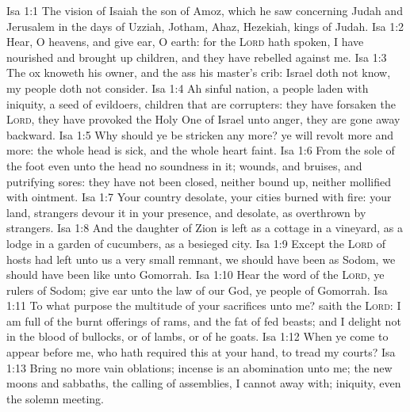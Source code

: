 \vs Isa 1:1 The vision of Isaiah the son of Amoz, which he saw concerning Judah and Jerusalem in the days of Uzziah, Jotham, Ahaz,  Hezekiah, kings of Judah.
\vs Isa 1:2 Hear, O heavens, and give ear, O earth: for the \textsc{Lord} hath spoken, I have nourished and brought up children, and they have rebelled against me.
\vs Isa 1:3 The ox knoweth his owner, and the ass his master's crib:  Israel doth not know, my people doth not consider.
\vs Isa 1:4 Ah sinful nation, a people laden with iniquity, a seed of evildoers, children that are corrupters: they have forsaken the \textsc{Lord}, they have provoked the Holy One of Israel unto anger, they are gone away backward.
\vs Isa 1:5 Why should ye be stricken any more? ye will revolt more and more: the whole head is sick, and the whole heart faint.
\vs Isa 1:6 From the sole of the foot even unto the head  no soundness in it;  wounds, and bruises, and putrifying sores: they have not been closed, neither bound up, neither mollified with ointment.
\vs Isa 1:7 Your country  desolate, your cities  burned with fire: your land, strangers devour it in your presence, and  desolate, as overthrown by strangers.
\vs Isa 1:8 And the daughter of Zion is left as a cottage in a vineyard, as a lodge in a garden of cucumbers, as a besieged city.
\vs Isa 1:9 Except the \textsc{Lord} of hosts had left unto us a very small remnant, we should have been as Sodom,  we should have been like unto Gomorrah.
\vs Isa 1:10 Hear the word of the \textsc{Lord}, ye rulers of Sodom; give ear unto the law of our God, ye people of Gomorrah.
\vs Isa 1:11 To what purpose  the multitude of your sacrifices unto me? saith the \textsc{Lord}: I am full of the burnt offerings of rams, and the fat of fed beasts; and I delight not in the blood of bullocks, or of lambs, or of he goats.
\vs Isa 1:12 When ye come to appear before me, who hath required this at your hand, to tread my courts?
\vs Isa 1:13 Bring no more vain oblations; incense is an abomination unto me; the new moons and sabbaths, the calling of assemblies, I cannot away with;  iniquity, even the solemn meeting.
